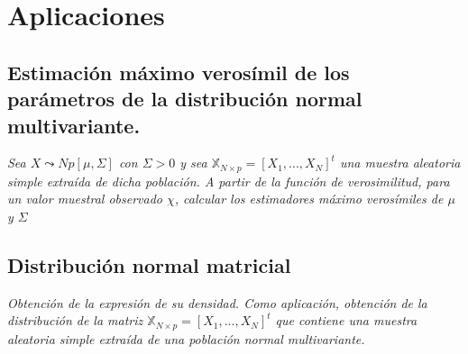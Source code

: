 \documentclass{article}
\theoremstyle{theorem-style}  %
\theoremstyle{definition-style}
\theoremstyle{example-style}
\theoremstyle{exercise-style}
\begin{document}
	\section{Aplicaciones}
	
	\subsection{Estimación máximo verosímil de los parámetros de la distribución normal multivariante.}
	
	\textit{Sea $X \leadsto Np[\mu, \Sigma]$ con $\Sigma > 0$ y sea $\mathbb{X}_{N \times p} = [X_1, ..., X_N]^t$ una muestra aleatoria simple extraída de dicha población. A partir de la función de verosimilitud, para un valor muestral observado $\chi$, calcular los estimadores máximo verosímiles de $\mu$ y $\Sigma$}
	
	\subsection{Distribución normal matricial}
	
	\textit{Obtención de la expresión de su densidad. Como aplicación, obtención de la distribución de la matriz $\mathbb{X}_{N \times p} = [X_1, ..., X_N]^t$ que contiene una muestra aleatoria simple extraída de una población normal multivariante.}
	
\end{document}
